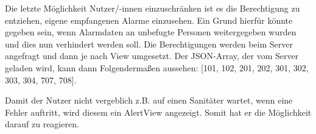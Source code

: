     Die letzte Möglichkeit Nutzer/-innen einzuschränken ist es die Berechtigung zu entziehen, 
    eigene empfangenen Alarme einzusehen. Ein Grund hierfür könnte gegeben sein, wenn Alarmdaten an 
    unbefugte Personen weitergegeben wurden und dies nun 
    verhindert werden soll. Die Berechtigungen werden beim Server angefragt und dann je 
    nach View umgesetzt. Der JSON-Array, der vom Server geladen wird, kann dann 
    Folgendermaßen aussehen: [101, 102, 201, 202, 301, 302, 303, 304, 707, 708].

    Damit der Nutzer nicht vergeblich z.B.  auf einen Sanitäter wartet, wenn eine Fehler auftritt,  
    wird diesem ein AlertView angezeigt. Somit hat er die Möglichkeit darauf zu reagieren.